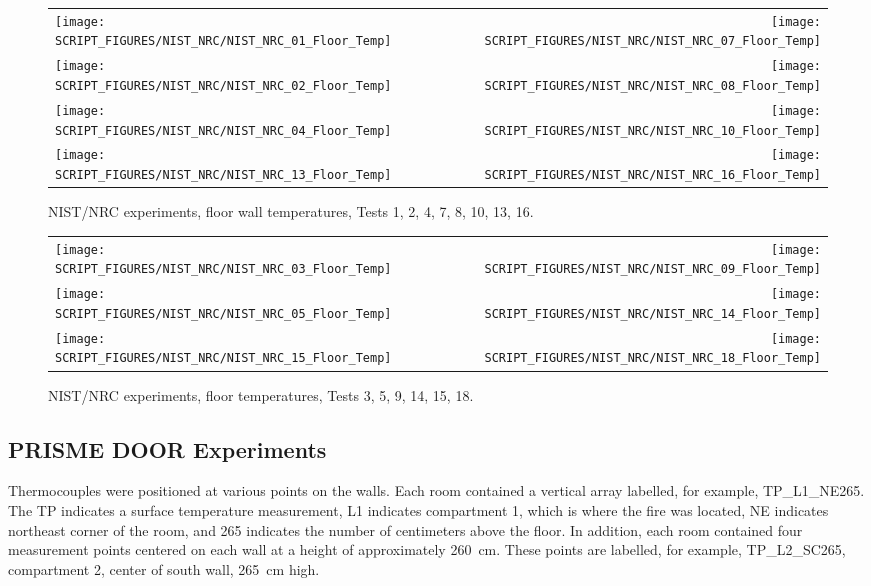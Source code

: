 \begin{figure}[p]
\begin{tabular*}{\textwidth}{l@{\extracolsep{\fill}}r}
\texttt{[image: SCRIPT\_FIGURES/NIST\_NRC/NIST\_NRC\_01\_Floor\_Temp]} &
\texttt{[image: SCRIPT\_FIGURES/NIST\_NRC/NIST\_NRC\_07\_Floor\_Temp]} \\
\texttt{[image: SCRIPT\_FIGURES/NIST\_NRC/NIST\_NRC\_02\_Floor\_Temp]} &
\texttt{[image: SCRIPT\_FIGURES/NIST\_NRC/NIST\_NRC\_08\_Floor\_Temp]} \\
\texttt{[image: SCRIPT\_FIGURES/NIST\_NRC/NIST\_NRC\_04\_Floor\_Temp]} &
\texttt{[image: SCRIPT\_FIGURES/NIST\_NRC/NIST\_NRC\_10\_Floor\_Temp]} \\
\texttt{[image: SCRIPT\_FIGURES/NIST\_NRC/NIST\_NRC\_13\_Floor\_Temp]} &
\texttt{[image: SCRIPT\_FIGURES/NIST\_NRC/NIST\_NRC\_16\_Floor\_Temp]}
\end{tabular*}
\caption{NIST/NRC experiments, floor wall temperatures, Tests 1, 2, 4, 7, 8, 10, 13, 16.}
\label{NIST_NRC_Floor_Temp_Closed}
\end{figure}

\begin{figure}[p]
\begin{tabular*}{\textwidth}{l@{\extracolsep{\fill}}r}
\texttt{[image: SCRIPT\_FIGURES/NIST\_NRC/NIST\_NRC\_03\_Floor\_Temp]} &
\texttt{[image: SCRIPT\_FIGURES/NIST\_NRC/NIST\_NRC\_09\_Floor\_Temp]} \\
\texttt{[image: SCRIPT\_FIGURES/NIST\_NRC/NIST\_NRC\_05\_Floor\_Temp]} &
\texttt{[image: SCRIPT\_FIGURES/NIST\_NRC/NIST\_NRC\_14\_Floor\_Temp]} \\
\texttt{[image: SCRIPT\_FIGURES/NIST\_NRC/NIST\_NRC\_15\_Floor\_Temp]} &
\texttt{[image: SCRIPT\_FIGURES/NIST\_NRC/NIST\_NRC\_18\_Floor\_Temp]}
\end{tabular*}
\caption{NIST/NRC experiments, floor temperatures, Tests 3, 5, 9, 14, 15, 18.}
\label{NIST_NRC_Floor_Temp_Open}
\end{figure}

\clearpage

\subsection{PRISME DOOR Experiments}

Thermocouples were positioned at various points on the walls. Each room contained a vertical array labelled, for example, TP\_L1\_NE265. The TP indicates a surface temperature measurement, L1 indicates compartment 1, which is where the fire was located, NE indicates northeast corner of the room, and 265 indicates the number of centimeters above the floor. In addition, each room contained four measurement points centered on each wall at a height of approximately 260~cm. These points are labelled, for example, TP\_L2\_SC265, compartment 2, center of south wall, 265~cm high.

